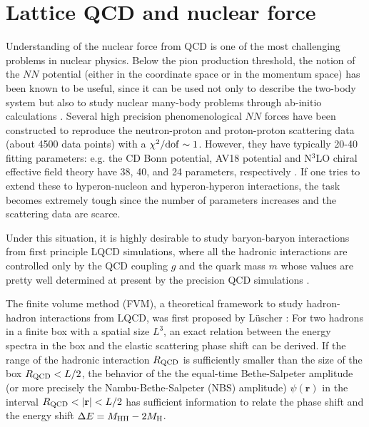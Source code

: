 \section{Lattice QCD and nuclear force}

Understanding of  the nuclear force from QCD
 is one of the most challenging problems in nuclear physics.
 Below the pion production threshold,
  the notion of the $NN$ potential (either in the coordinate space or in
  the  momentum space) has been known to be  useful, since it can be 
   used not only to describe the two-body system but also to 
   study  nuclear many-body problems through ab-initio calculations \cite{this_book}.
  Several high precision phenomenological $NN$ forces 
  have been constructed to reproduce
  the   neutron-proton and proton-proton scattering data (about 4500 data points)
   with a $\chi^2/{\rm dof} \sim 1$. However, 
     they have typically 20-40 fitting parameters:
   e.g. the CD Bonn potential, AV18 potential and N$^3$LO chiral effective field 
   theory have 38, 40, and 24 parameters, respectively \cite{Machleidt:2007ms}.
  If one tries to extend these to hyperon-nucleon and hyperon-hyperon interactions,
  the task becomes extremely tough since  the number of parameters 
   increases and the scattering data are scarce.
 
    Under this situation, it is highly desirable to
  study  baryon-baryon interactions from  first principle
  LQCD simulations, where  all the hadronic interactions are
   controlled only by the QCD coupling $g$  and 
    the quark mass $m$  whose values are
    pretty well determined at present by the precision QCD simulations \cite{Aoki:2013ldr}.
 
 The finite volume method (FVM), a
  theoretical framework to study hadron-hadron interactions
  from LQCD, was first  proposed 
  by L\"{u}scher \cite{luescher}: For two hadrons in a finite
  box with a spatial size $L^3$,  
  an exact relation between  the energy spectra in the box
  and the elastic scattering phase shift can be 
   derived.  If the range of the hadronic interaction $R_{\rm QCD}$  is sufficiently
  smaller than the size of the box $R_{\rm QCD}<L/2$, the behavior of the 
  the equal-time Bethe-Salpeter amplitude (or more precisely 
  the Nambu-Bethe-Salpeter (NBS) amplitude)
     $\psi (\mathbf{r})$ in the interval $R_{\rm QCD} < | \mathbf{r} | < L/2 $
    has sufficient information to relate the phase shift and the 
  energy shift $\Delta E =M_{\rm HH}-2M_{\rm H}$.
  
